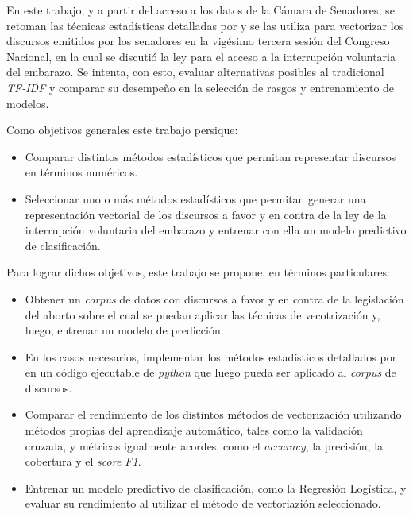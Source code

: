 En este trabajo, y a partir del acceso a los datos de la Cámara de Senadores,
se retoman las técnicas estadísticas detalladas por
\citeauthor{monroe2008fightin} y se las utiliza para vectorizar los
discursos emitidos por los senadores en la vigésimo tercera sesión
del Congreso Nacional, en la cual se discutió la ley para el acceso a
la interrupción voluntaria del embarazo.
Se intenta, con esto, evaluar alternativas posibles al tradicional \textit{TF-IDF}
y comparar su desempeño en la selección de rasgos y entrenamiento de modelos.

Como objetivos generales este trabajo persique:

\begin{itemize}
    \item{Comparar distintos m\'etodos estad\'isticos que permitan representar
    discursos en t\'erminos num\'ericos.}
    \item{Seleccionar uno o más m\'etodos estad\'isticos que permitan
    generar una representación vectorial de los discursos a favor y en
    contra de la ley de la interrupción voluntaria del embarazo y entrenar
    con ella un modelo predictivo de clasificación.}
\end{itemize}

Para lograr dichos objetivos, este trabajo se propone, en términos
particulares:

\begin{itemize}
    \item{Obtener un \textit{corpus} de datos con discursos a favor y en contra
    de la legislación del aborto sobre el cual se puedan aplicar las técnicas de
    vecotrización y, luego, entrenar un modelo de predicción.}
    \item{En los casos necesarios, implementar los métodos estadísticos detallados
    por \cite{monroe2008fightin} en un código ejecutable de \textit{python} que
    luego pueda ser aplicado al \textit{corpus} de discursos.}
    \item{Comparar el rendimiento de los distintos métodos de vectorización utilizando
    métodos propias del aprendizaje automático, tales como la validación
    cruzada, y métricas igualmente acordes, como el \textit{accuracy}, la precisión,
    la cobertura y el \textit{score F1}.}
    \item{Entrenar un modelo predictivo de clasificación, como la Regresión Logística,
    y evaluar su rendimiento al utilizar el método de vectoriazión seleccionado.}
\end{itemize}

